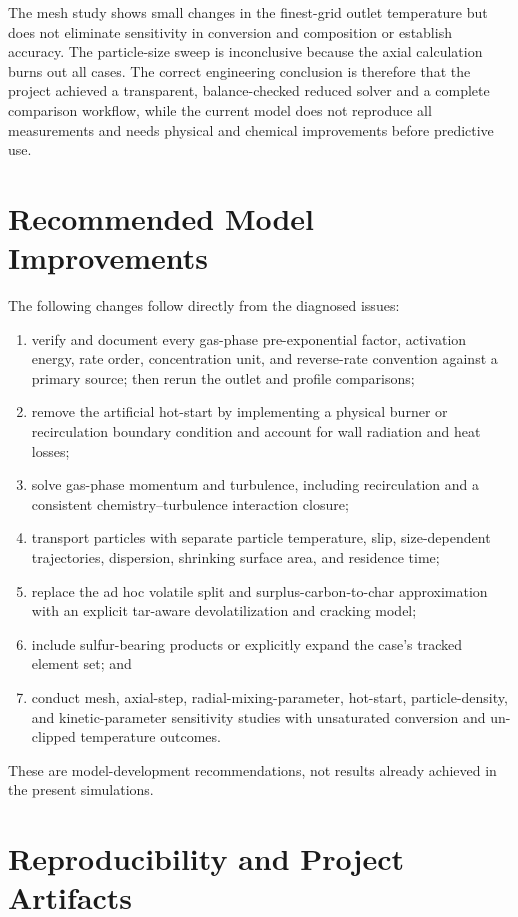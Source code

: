\documentclass[journal]{IEEEtran}
\begin{document}
The mesh study shows small changes in the finest-grid outlet temperature but does not eliminate sensitivity in conversion and composition or establish accuracy. The particle-size sweep is inconclusive because the axial calculation burns out all cases. The correct engineering conclusion is therefore that the project achieved a transparent, balance-checked reduced solver and a complete comparison workflow, while the current model does not reproduce all measurements and needs physical and chemical improvements before predictive use.

\section{Recommended Model Improvements}
The following changes follow directly from the diagnosed issues:
\begin{enumerate}
  \item verify and document every gas-phase pre-exponential factor, activation energy, rate order, concentration unit, and reverse-rate convention against a primary source; then rerun the outlet and profile comparisons;
  \item remove the artificial hot-start by implementing a physical burner or recirculation boundary condition and account for wall radiation and heat losses;
  \item solve gas-phase momentum and turbulence, including recirculation and a consistent chemistry--turbulence interaction closure;
  \item transport particles with separate particle temperature, slip, size-dependent trajectories, dispersion, shrinking surface area, and residence time;
  \item replace the ad hoc volatile split and surplus-carbon-to-char approximation with an explicit tar-aware devolatilization and cracking model;
  \item include sulfur-bearing products or explicitly expand the case's tracked element set; and
  \item conduct mesh, axial-step, radial-mixing-parameter, hot-start, particle-density, and kinetic-parameter sensitivity studies with unsaturated conversion and un-clipped temperature outcomes.
\end{enumerate}
These are model-development recommendations, not results already achieved in the present simulations.

\section{Reproducibility and Project Artifacts}
\end{document}
